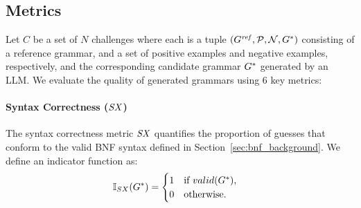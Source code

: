
\subsection{Metrics}
Let $C$ be a set of $N$ challenges where each is a tuple 
$(G^{\mathit{ref}},\mathcal{P},\mathcal{N}, G^*)$ consisting of a reference grammar, and a set of positive examples and negative examples, respectively, and the corresponding candidate grammar $G^*$ generated by an LLM. We evaluate the quality of generated grammars using 6 key metrics:

\paragraph{Syntax Correctness ($\mathit{SX}$)}
The syntax correctness metric $\mathit{SX}$ quantifies the proportion of guesses that conform to the valid BNF syntax defined in Section~\ref{sec:bnf_background}.
We define an indicator function as:
\begin{align*}
\mathbb{I}_{SX}(G^*) &=
\begin{cases}
1 & \text{if $valid(G^*)$,}\\
0 & \text{otherwise.}
\end{cases}
\end{align*}

